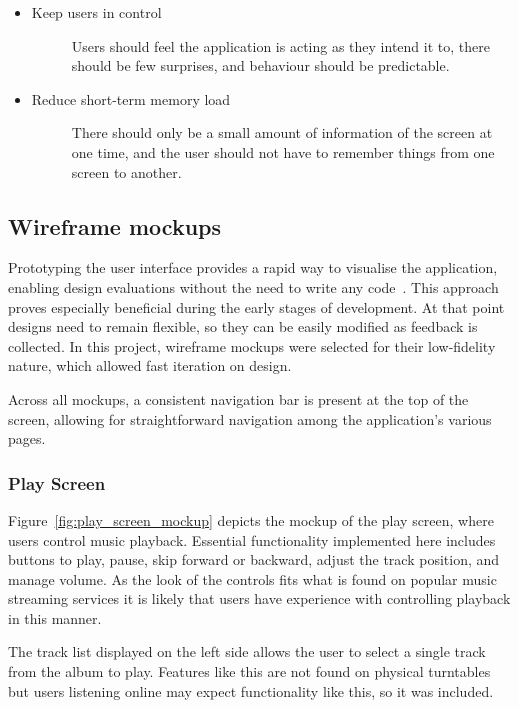 \begin{itemize}
\begin{description}
    \end{description}
    \item Keep users in control
    \begin{description}
        \item[] Users should feel the application is acting as they intend it to, there should be few surprises, and behaviour should be predictable.
    \end{description}
    \item Reduce short-term memory load
    \begin{description}
        \item[] There should only be a small amount of information of the screen at one time, and the user should not have to remember things from one screen to another.
    \end{description}
\end{itemize}
\fi

\subsection{Wireframe mockups}
Prototyping the user interface provides a rapid way to visualise the application, enabling design evaluations without the need to write any code~\cite{WILSON1988859}. This approach proves especially beneficial during the early stages of development. At that point designs need to remain flexible, so they can be easily modified as feedback is collected. In this project, wireframe mockups were selected for their low-fidelity nature, which allowed fast iteration on design.

Across all mockups, a consistent navigation bar is present at the top of the screen, allowing for straightforward navigation among the application's various pages.

\subsubsection{Play Screen}
Figure~\ref{fig:play_screen_mockup} depicts the mockup of the play screen, where users control music playback. Essential functionality implemented here includes buttons to play, pause, skip forward or backward, adjust the track position, and manage volume. As the look of the controls fits what is found on popular music streaming services it is likely that users have experience with controlling playback in this manner.

The track list displayed on the left side allows the user to select a single track from the album to play. Features like this are not found on physical turntables but users listening online may expect functionality like this, so it was included.


